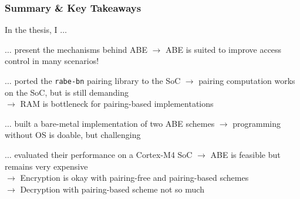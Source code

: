 \begin{frame}[c]
    \frametitle{Summary \& Key Takeaways}
    
        In the thesis, I $\dots$

        \pause
        $\dots$ present the mechanisms behind ABE \textcolor{TUMGruen}{\checkmark} \pause \alert{$\rightarrow$ ABE is suited to improve access control in many scenarios!}

        \pause $\dots$ ported the \texttt{rabe-bn} pairing library to the SoC \textcolor{TUMGruen}{\checkmark} \pause \alert{$\rightarrow$ pairing computation works on the SoC, but is still demanding}\\
        \pause {} \alert{$\rightarrow$ RAM is bottleneck for pairing-based implementations}

        \pause $\dots$ built a bare-metal implementation of two ABE schemes \textcolor{TUMGruen}{\checkmark} \pause \alert{$\rightarrow$ programming without OS is doable, but challenging \smiley}

        \pause $\dots$ evaluated their performance on a Cortex-M4 SoC \textcolor{TUMGruen}{\checkmark} \pause \alert{$\rightarrow$ ABE is feasible but remains very expensive}\\        
        \pause {} \alert{$\rightarrow$ Encryption is okay with pairing-free and pairing-based schemes}\\
        \pause {} \alert{$\rightarrow$ Decryption with pairing-based scheme not so much \frownie}


\end{frame}

